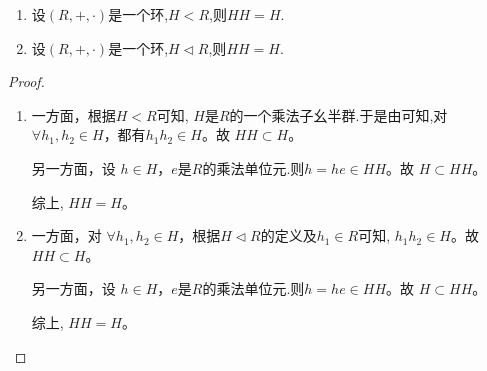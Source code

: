 \documentclass[../../main.tex]{subfiles}
\begin{document}
\begin{lemma}\label{lemma:子环和理想与自身的乘积等于其自身}
\begin{enumerate}[(1)]
\item 设$(R,+,\cdot)$是一个环,$H< R$,则$HH=H$.

\item 设$(R,+,\cdot)$是一个环,$H\lhd R$,则$HH=H$.
\end{enumerate}
\end{lemma}
\begin{proof}
\begin{enumerate}[(1)]
\item 一方面，根据$H< R$可知, $H$是$R$的一个乘法子幺半群.于是由可知,对 $\forall h_1,h_2\in H$，都有$h_1h_2\in H$。故 $HH\subset H$。

另一方面，设 $h\in H$，$e$是$R$的乘法单位元.则$h = he\in HH$。故 $H\subset HH$。

综上, $HH = H$。

\item 一方面，对 $\forall h_1,h_2\in H$，根据$H\lhd R$的定义及$h_1\in R$可知, $h_1h_2\in H$。故 $HH\subset H$。

另一方面，设 $h\in H$，$e$是$R$的乘法单位元.则$h = he\in HH$。故 $H\subset HH$。

综上,  $HH = H$。
\end{enumerate}
\end{proof}
\end{document}
